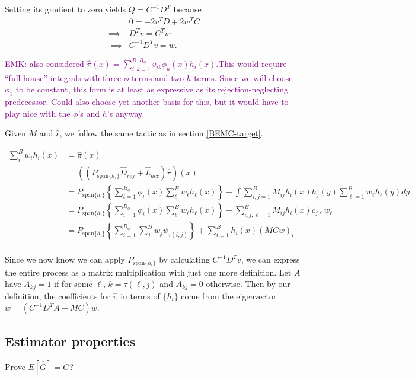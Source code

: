 \documentclass{article}
\newcommand\EMK[1]{\textcolor{purple}{EMK: #1}}
\begin{document}
Setting its gradient to zero yields $Q=C^{-1}D^T$ because
\begin{align*}
&0= -2v^TD + 2w^TC\\
\implies& D^Tv = C^Tw\\ \
\implies& C^{-1}D^Tv = w.
\end{align*}

\EMK{ also considered $\hat{\pi}(x) = \sum_{i,k=1}^{B,B_\phi}v_{ik}\phi_k(x)h_i(x)$.This would require ``full-house'' integrals with three $\phi$ terms and two $h$ terms. Since we will choose $\phi_1$ to be constant, this form is at least as expressive as its rejection-neglecting predecessor. Could also choose yet another basis for this, but it would have to play nice with the $\phi$'s and $h$'s anyway.}

 Given ${M}$ and $\hat{r}$, we follow the same tactic as in section \ref{BEMC-target}. 

\begin{align*}
\sum_{i}^{B}w_{i}h_i(x)&=\hat{\pi}(x) \\
&=((P_{\text{span}\{h_i\}}\hat{D}_{rej} + 
\hat{L}_{acc})\hat{\pi})(x) 
\\
&=  P_{\text{span}\{h_i\}}\left\{\sum_{i=1}^{B_\phi} \phi_i(x) \sum_{\ell}^{B}w_{\ell}h_\ell(x)\right\} + 
\int \sum_{i,j=1}^B M_{ij} h_i(x)h_j(y) \sum_{\ell=1}^{B}w_{\ell}h_\ell(y)dy
\\
&=  P_{\text{span}\{h_i\}}\left\{\sum_{i=1}^{B_\phi} \phi_i(x) \sum_{\ell}^{B}w_{\ell}h_\ell(x)\right\} + 
 \sum_{i,j, \ell=1}^B M_{ij} h_i(x)c_{j\ell}w_{\ell}
\\
&=  P_{\text{span}\{h_i\}}\left\{\sum_{i=1}^{B_\phi} \sum_{j}^{B}w_{j} \psi_{\tau(i,j)}\right\}+ 
 \sum_{i=1}^B h_i(x)(MCw)_{i}\\
\end{align*}

Since we now know we can apply $ P_{\text{span}\{h_i\}}$ by calculating $C^{-1}D^Tv$, we can express the entire process as a matrix multiplication with just one more definition. Let $A$ have $A_{kj}=1$ if for some $\ell$, $k=\tau(\ell, j)$ and $A_{kj}=0$ otherwise. Then by our definition, the coefficients for $\hat{\pi}$ in terms of $\{h_i\}$ come from the eigenvector $w = (C^{-1}D^TA + MC)w$.


\subsection{Estimator properties}
\label{sec:properties}

Prove $E[\hat G] = \tilde G$?
\end{document}
